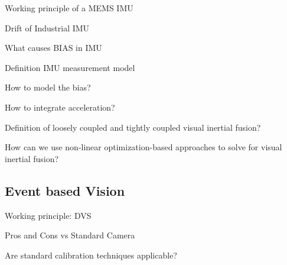 \documentclass[10pt,a4paper]{scrartcl}
\begin{document}
\begin{multicols*}{2}
\begin{QandA}
{Working principle of a MEMS IMU}
\item
\end{QandA}

\begin{QandA}
{Drift of Industrial IMU}
\item
\end{QandA}

\begin{QandA}
{What causes BIAS in IMU}
\item
\end{QandA}

\begin{QandA}
{Definition IMU measurement model}
\item
\end{QandA}

\begin{QandA}
{How to model the bias?}
\item
\end{QandA}

\begin{QandA}
{How to integrate acceleration?}
\item
\end{QandA}

\begin{QandA}
{Definition of loosely coupled and tightly coupled visual inertial fusion?}
\item
\end{QandA}

\begin{QandA}
{How can we use non-linear optimization-based approaches to solve for visual inertial fusion?}
\item
\end{QandA}

\subsection*{Event based Vision}

\begin{QandA}
{Working principle: DVS}
\item
\end{QandA}

\begin{QandA}
{Pros and Cons vs Standard Camera}
\item
\end{QandA}

\begin{QandA}
{Are standard calibration techniques applicable?}
\item
\end{QandA}


\end{multicols*}
\end{document}
